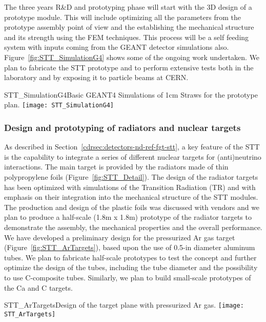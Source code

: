 The three years R\&D and prototyping phase will start with the 3D design of a prototype module. 
This will include optimizing all the parameters from the prototype assembly point of view and the 
establishing the mechanical structure and its strength using the FEM techniques. This process will 
be a self feeding system with inputs coming from the GEANT detector simulations also. 
Figure~\ref{fig:STT_SimulationG4} shows some of the ongoing work undertaken. We plan to fabricate the STT 
prototype and to perform extensive tests both in the laboratory and by 
exposing it to particle beams at CERN. 

\begin{cdrfigure} 
{STT_SimulationG4}{Basic GEANT4 Simulations of 1cm Straws for the prototype plan.}
\texttt{[image: STT\_SimulationG4]}
\end{cdrfigure}


\subsubsection{Design and prototyping of radiators and nuclear targets} 

As described in Section~\ref{cdrsec:detectors-nd-ref-fgt-stt}, a key feature of the STT is the 
capability to integrate a series of different nuclear targets for (anti)neutrino interactions. 
The main target is provided by the radiators made of thin polypropylene foils (Figure~\ref{fig:STT_Detail}). 
The design of the radiator targets has been optimized with simulations of the Transition Radiation (TR) 
and with emphasis on their integration into the mechanical structure of the STT modules. 
The production and design of the plastic foils was discussed with vendors and we plan to produce 
a half-scale (1.8m x 1.8m) prototype of the radiator targets to demonstrate the assembly, the 
mechanical properties and the overall performance. We have developed a preliminary design for the 
pressurized Ar gas target (Figure~\ref{fig:STT_ArTargets}), based upon the use of 0.5-in diameter aluminum tubes. 
We plan to fabricate half-scale prototypes to test the concept and further optimize the design of 
the tubes, including the tube diameter and the possibility to use C-composite tubes. 
Similarly, we plan to build small-scale prototypes of the Ca and C targets.

\begin{cdrfigure} 
{STT_ArTargets}{Design of the target plane with pressurized Ar gas.}
\texttt{[image: STT\_ArTargets]}
\end{cdrfigure}


